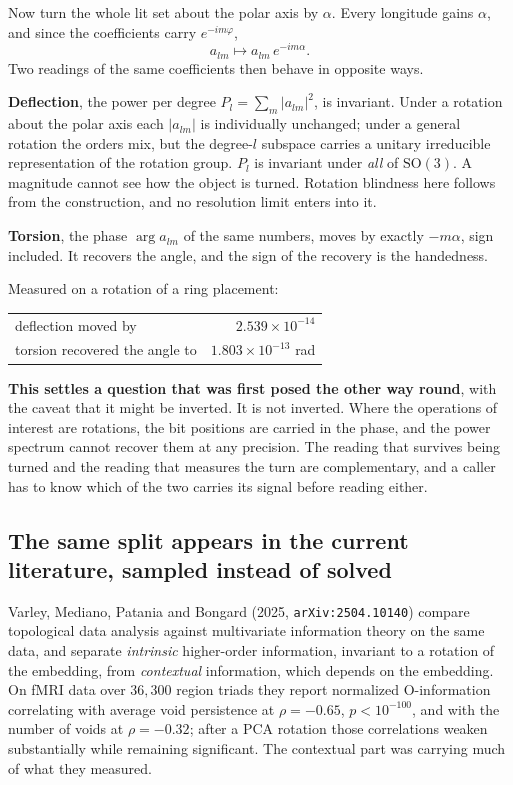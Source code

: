 Now turn the whole lit set about the polar axis by \(\alpha\). Every longitude gains \(\alpha\), and since the coefficients carry \(e^{-im\varphi}\),
\[
  a_{lm} \longmapsto a_{lm} \, e^{-im\alpha}.
\]
Two readings of the same coefficients then behave in opposite ways.

\textbf{Deflection}, the power per degree \(P_l = \sum_m |a_{lm}|^2\), is invariant. Under a rotation about the polar axis each \(|a_{lm}|\) is individually unchanged; under a general rotation the orders mix, but the degree-\(l\) subspace carries a unitary irreducible representation of the rotation group. \(P_l\) is invariant under \emph{all} of \(\mathrm{SO}(3)\). A magnitude cannot see how the object is turned. Rotation blindness here follows from the construction, and no resolution limit enters into it.

\textbf{Torsion}, the phase \(\arg a_{lm}\) of the same numbers, moves by exactly \(-m\alpha\), sign included. It recovers the angle, and the sign of the recovery is the handedness.

Measured on a rotation of a ring placement:

\begin{center}
\begin{tabular}{lr}
\toprule
deflection moved by & \(2.539 \times 10^{-14}\) \\
torsion recovered the angle to & \(1.803 \times 10^{-13}\) rad \\
\bottomrule
\end{tabular}
\end{center}

\textbf{This settles a question that was first posed the other way round}, with the caveat that it might be inverted. It is not inverted. Where the operations of interest are rotations, the bit positions are carried in the phase, and the power spectrum cannot recover them at any precision. The reading that survives being turned and the reading that measures the turn are complementary, and a caller has to know which of the two carries its signal before reading either.

\subsection{The same split appears in the current literature, sampled instead of solved}

Varley, Mediano, Patania and Bongard (2025, \texttt{arXiv:2504.10140}) compare topological data analysis against multivariate information theory on the same data, and separate \emph{intrinsic} higher-order information, invariant to a rotation of the embedding, from \emph{contextual} information, which depends on the embedding. On fMRI data over \(36{,}300\) region triads they report normalized O-information correlating with average void persistence at \(\rho = -0.65\), \(p < 10^{-100}\), and with the number of voids at \(\rho = -0.32\); after a PCA rotation those correlations weaken substantially while remaining significant. The contextual part was carrying much of what they measured.

